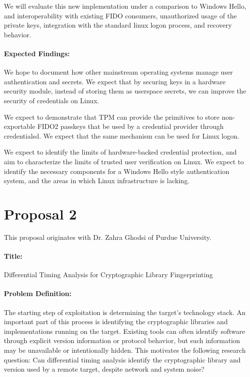 \documentclass{article}
\begin{document}
We will evaluate this new implementation under a comparison to Windows Hello, and interoperability with existing FIDO
consumers, unauthorized usage of the private keys, integration
with the standard linux logon process, and recovery behavior.

\paragraph{Expected Findings:} We hope to document how other mainstream operating
systems manage user authentication and secrets. We expect that by securing 
keys in a hardware security module, instead of storing them as userspace secrets,
we can improve the security of credentials on Linux.

We expect to demonstrate that TPM can provide the primitives to store non-exportable FIDO2 passkeys
that be used by a credential provider through credentialsd. We expect that the same mechanism can be used
for Linux logon.

We expect to identify the limits of hardware-backed credential protection, and aim to characterize
the limits of trusted user verification on Linux. We expect to identify the necessary components
for a Windows Hello style authentication system, and the areas in which Linux infrastructure is lacking.



\newpage

\section*{Proposal 2}

This proposal originates with Dr. Zahra Ghodsi of Purdue University. 

\paragraph{Title:} Differential Timing Analysis for Cryptographic Library Fingerprinting

\paragraph{Problem Definition:} The starting step of exploitation is
determining the target's technology stack. An important part of
this process is identifying the cryptographic libraries and
implementations running on the target. Existing tools can often
identify software through explicit version information or protocol
behavior, but such information may be unavailable or intentionally
hidden. This motivates the following research question:
Can differential timing analysis identify the cryptographic library
and version used by a remote target, despite network and system
noise?
\end{document}
